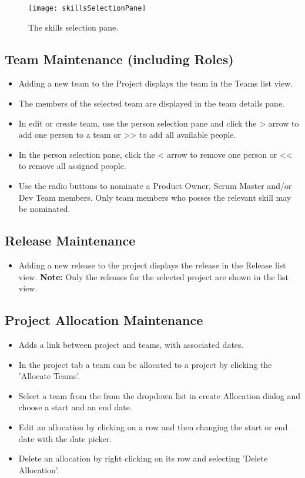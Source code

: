 \documentclass[11pt,fleqn]{book} %
\begin{document}
\begin{figure}[H]
  \centering
  \texttt{[image: skillsSelectionPane]}
  \caption{The skills selection pane.\label{skillsSelectionPane}}
\end{figure}

\subsection{Team Maintenance (including Roles)}
\begin{itemize}
  \item Adding a new team to the Project displays the team in the Teams list view. 
  \item The members of the selected team are displayed in the team details pane.
  \item In edit or create team, use the person selection pane and click the > arrow to add one person to a team or >> to add all available people.
  \item In the person selection pane, click the < arrow to remove one person or << to remove all assigned people. 
  \item Use the radio buttons to nominate a Product Owner, Scrum Master and/or Dev Team members. Only team members who posses the relevant skill may be nominated.
\end{itemize}


\subsection{Release Maintenance}
\begin{itemize}
  \item Adding a new release to the project displays the release in the Release list view.
    \textbf{Note:} Only the releases for the selected project are shown in the list view.
\end{itemize}

\subsection{Project Allocation Maintenance}
\begin{itemize}
  \item Adds a link between project and teams, with associated dates.
  \item In the project tab a team can be allocated to a project by clicking the 'Allocate Teams'.
  \item Select a team from the from the dropdown list in create Allocation dialog and choose a start and an end date.
  \item Edit an allocation by clicking on a row and then changing the start or end date with the date picker.
  \item Delete an allocation by right clicking on its row and selecting 'Delete Allocation'.
\end{itemize}
\end{document}
